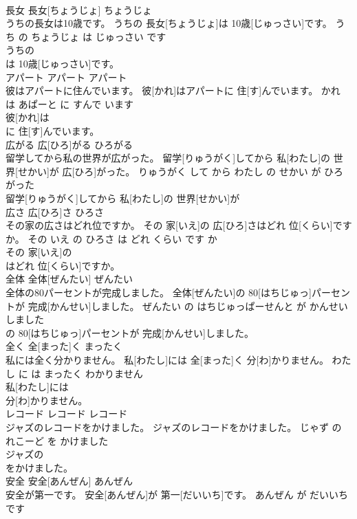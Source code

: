 \documentclass[8pt]{extreport}
\begin{document}
\begin{CJK}{UTF8}{min}
\\	長女	長女[ちょうじょ]	ちょうじょ	
\\	うちの長女は10歳です。	うちの 長女[ちょうじょ]は 10歳[じゅっさい]です。	うち の ちょうじょ は じゅっさい です	
\\	うちの
\\	は 10歳[じゅっさい]です。			
\\	アパート	アパート	アパート	
\\	彼はアパートに住んでいます。	彼[かれ]はアパートに 住[す]んでいます。	かれ は あぱーと に すんで います	
\\	彼[かれ]は
\\	に 住[す]んでいます。			
\\	広がる	広[ひろ]がる	ひろがる	
\\	留学してから私の世界が広がった。	留学[りゅうがく]してから 私[わたし]の 世界[せかい]が 広[ひろ]がった。	りゅうがく して から わたし の せかい が ひろがった	
\\	留学[りゅうがく]してから 私[わたし]の 世界[せかい]が
\\	広さ	広[ひろ]さ	ひろさ	
\\	その家の広さはどれ位ですか。	その 家[いえ]の 広[ひろ]さはどれ 位[くらい]ですか。	その いえ の ひろさ は どれ くらい です か	
\\	その 家[いえ]の
\\	はどれ 位[くらい]ですか。			
\\	全体	全体[ぜんたい]	ぜんたい	
\\	全体の80パーセントが完成しました。	全体[ぜんたい]の 80[はちじゅっ]パーセントが 完成[かんせい]しました。	ぜんたい の はちじゅっぱーせんと が かんせい しました	
\\	の 80[はちじゅっ]パーセントが 完成[かんせい]しました。			
\\	全く	全[まった]く	まったく	
\\	私には全く分かりません。	私[わたし]には 全[まった]く 分[わ]かりません。	わたし に は まったく わかりません	
\\	私[わたし]には
\\	分[わ]かりません。			
\\	レコード	レコード	レコード	
\\	ジャズのレコードをかけました。	ジャズのレコードをかけました。	じゃず の れこーど を かけました	
\\	ジャズの
\\	をかけました。			
\\	安全	安全[あんぜん]	あんぜん	
\\	安全が第一です。	安全[あんぜん]が 第一[だいいち]です。	あんぜん が だいいち です	

\end{CJK}
\end{document}
